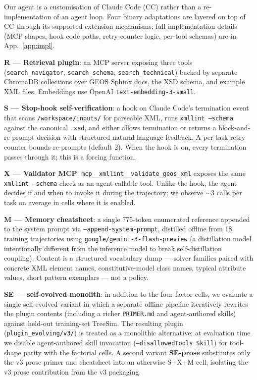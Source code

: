 \documentclass{article}
\begin{document}
Our agent is a customisation of Claude Code (CC) rather than a re-implementation of an agent loop. Four binary adaptations are layered on top of CC through its supported extension mechanisms; full implementation details (MCP shapes, hook code paths, retry-counter logic, per-tool schemas) are in App.~\ref{app:impl}.

\textbf{R --- Retrieval plugin}: an MCP server exposing three tools (\texttt{search\_navigator}, \texttt{search\_schema}, \texttt{search\_technical}) backed by separate ChromaDB collections over GEOS Sphinx docs, the XSD schema, and example XML files. Embeddings use OpenAI \texttt{text-embedding-3-small}.

\textbf{S --- Stop-hook self-verification}: a hook on Claude Code's termination event that scans \texttt{/workspace/inputs/} for parseable XML, runs \texttt{xmllint --schema} against the canonical \texttt{.xsd}, and either allows termination or returns a block-and-re-prompt decision with structured natural-language feedback. A per-task retry counter bounds re-prompts (default 2). When the hook is on, every termination passes through it; this is a forcing function.

\textbf{X --- Validator MCP}: \texttt{mcp\_\_xmllint\_\_validate\_geos\_xml} exposes the same \texttt{xmllint --schema} check as an agent-callable tool. Unlike the hook, the agent decides if and when to invoke it during the trajectory; we observe ${\sim}3$ calls per task on average in cells where it is enabled.

\textbf{M --- Memory cheatsheet}: a single 775-token enumerated reference appended to the system prompt via \texttt{--append-system-prompt}, distilled offline from 18 training trajectories using \texttt{google/gemini-3-flash-preview} (a distillation model intentionally different from the inference model to break self-distillation coupling). Content is a structured vocabulary dump --- solver families paired with concrete XML element names, constitutive-model class names, typical attribute values, short pattern exemplars --- not a policy.

\textbf{SE --- self-evolved monolith}: in addition to the four-factor cells, we evaluate a single self-evolved variant in which a separate offline pipeline iteratively rewrites the plugin contents (including a richer \texttt{PRIMER.md} and agent-authored skills) against held-out training-set TreeSim. The resulting plugin (\texttt{plugin\_evolving/v3/}) is treated as a monolithic alternative; at evaluation time we disable agent-authored skill invocation (\texttt{--disallowedTools Skill}) for tool-shape parity with the factorial cells. A second variant \textbf{SE-prose} substitutes only the v3 prose primer and cheatsheet into an otherwise S+X+M cell, isolating the v3 prose contribution from the v3 packaging.
\end{document}
